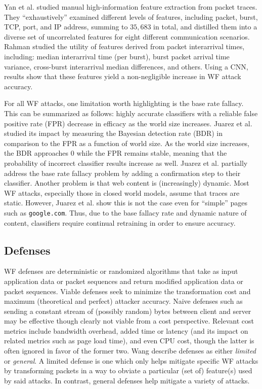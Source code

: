 \documentclass[runningheads]{llncs}
\begin{document}
\begin{description}
\end{description}

Yan et al. \cite{yan2018feature} studied manual high-information feature extraction from packet traces.
They ``exhaustively'' examined different levels of features, including packet, burst, TCP, port, and IP address,
summing to $35,683$ in total, and distilled them into a diverse set of uncorrelated features for eight
different communication scenarios. Rahman \cite{rahman2018using} studied the utility of features derived
from packet interarrival times, including: median interarrival time (per burst), burst packet arrival
time variance, cross-burst interarrival median differences, and others. Using a CNN, results show that
these features yield a non-negligible increase in WF attack accuracy.

For all WF attacks, one limitation worth highlighting is the base rate fallacy. This can be summarized
as follows: highly accurate classifiers with a reliable false positive rate (FPR) decrease in
efficacy as the world size increases. Juarez et al. \cite{juarez2014critical} studied its impact by
measuring the Bayesian detection rate (BDR) in comparison to the FPR as a function of world size.
As the world size increases, the BDR approaches $0$ while the FPR remains stable, meaning that the probability
of incorrect classifier results increase as well. Juarez et al. partially address the base rate fallacy
problem by adding a confirmation step to their classifier.
Another problem is that web content is (increasingly) dynamic. Most WF attacks, especially those in closed
world models, assume that traces are static. However, Juarez et al. \cite{juarez2014critical} show
this is not the case even for ``simple'' pages such as {\tt google.com}. Thus, due to the base fallacy
rate and dynamic nature of content, classifiers require continual retraining in order to ensure accuracy.

\subsection{Defenses} \label{sec:defenses}
WF defenses are deterministic or randomized algorithms that take as input application data or packet sequences
and return modified application data or packet sequences. Viable defenses seek to minimize the transformation
cost and maximum (theoretical and perfect) attacker accuracy. Naive defenses such as sending a constant stream
of (possibly random) bytes between client and server may be effective though clearly not viable from a cost
perspective. Relevant cost metrics include bandwidth overhead, added time or latency (and its impact on related
metrics such as page load time), and even CPU cost, though the latter is often ignored in favor of the former two.
Wang \cite{wang2016website} describe defenses as either \emph{limited} or \emph{general}. A limited defense is
one which only helps mitigate specific WF attacks by transforming packets in a way to obviate a particular
(set of) feature(s) used by said attacks. In contrast, general defenses help mitigate a variety of attacks.
\end{document}
